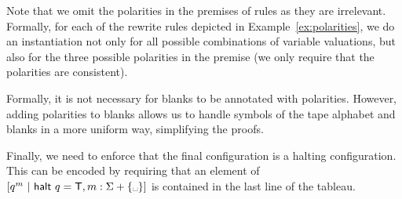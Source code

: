\begin{example}[Polarities]
\begin{center}
  \end{center}
\end{example}

Note that we omit the polarities in the premises of rules as they are irrelevant.
Formally, for each of the rewrite rules depicted in Example~\ref{ex:polarities}, we do an instantiation not only for all possible combinations of variable valuations, but also for the three possible polarities in the premise (we only require that the polarities are consistent).

\begin{remark}
  Formally, it is not necessary for blanks to be annotated with polarities. However, adding polarities to blanks allows us to handle symbols of the tape alphabet and blanks in a more uniform way, simplifying the proofs. 
\end{remark}

Finally, we need to enforce that the final configuration is a halting configuration. This can be encoded by requiring that an element of $[q^m~|~\textsf{halt}~q = \btrue, m : \Sigma + \{\blank\}]$ is contained in the last line of the tableau.

